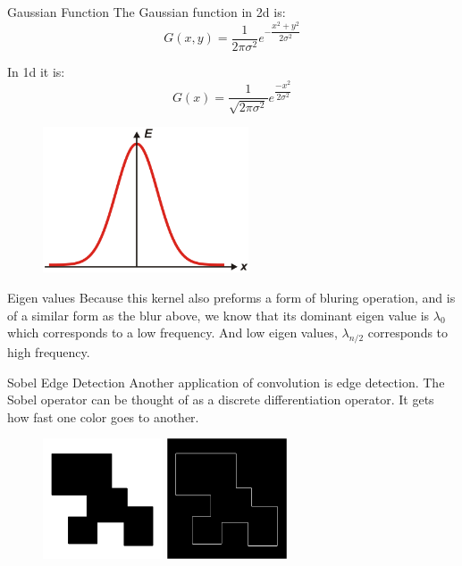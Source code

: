 \documentclass{beamer}
\begin{document}
\begin{frame}{Gaussian Function}
The Gaussian function in 2d is:
$$G(x,y) = \dfrac{1}{2\pi \sigma^2}e^{-\dfrac{x^2+y^2}{2 \sigma^2}}$$

In 1d it is:
$$ G(x) = \dfrac{1}{\sqrt{2\pi \sigma^2}}e^{\dfrac{-x^2}{2\sigma^2}}$$

\begin{figure}[ht]
\includegraphics[width=2.4in]{gauss.png}
\end{figure}
\end{frame}


\begin{frame} {Eigen values}
Because this kernel also preforms a form of bluring operation, and is of a similar form as the blur above, we know that its dominant eigen value is $\lambda_0$ which corresponds to a low frequency. And low eigen values, $\lambda_{n/2}$ corresponds to high frequency.
\end{frame}


\begin{frame}{Sobel Edge Detection}
Another application of convolution is edge detection. The Sobel operator can be thought of as a discrete differentiation operator. It gets how fast one color goes to another. 

\begin{figure}[ht]
\includegraphics[width=1.4in]{edgein.png}
\hspace{.1in}
\includegraphics[width=1.4in]{edgeout.jpg}
\hspace{.1in}
\end{figure}
\end{frame}
\end{document}
